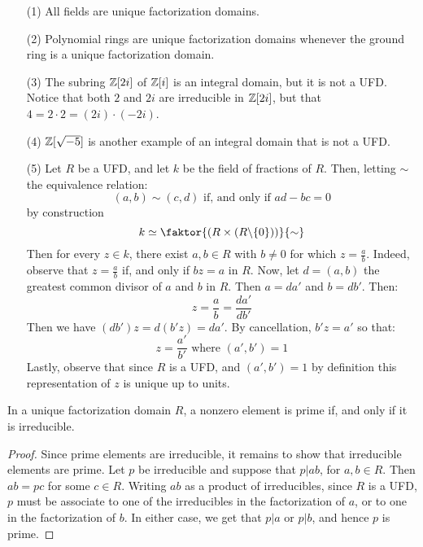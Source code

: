 \begin{example}\label{example_6.8}
  \begin{enumerate}
    \item[(1)] All fields are unique factorization domains.

    \item[(2)] Polynomial rings are unique factorization domains whenever
      the ground ring is a unique factorization domain.

    \item[(3)] The subring $\mathbb{Z}[2i]$ of $\mathbb{Z}[i]$ is an integral domain, but it
      is not a UFD. Notice that both $2$ and  $2i$ are irreducible in
      $\mathbb{Z}[2i]$, but that $4=2 \cdot 2=(2i) \cdot (-2i)$.

    \item[(4)] $\mathbb{Z}[\sqrt{-5}]$ is another example of an integral domain that
      is not a UFD.

    \item[(5)] Let $R$ be a UFD, and let $k$ be the field of fractions
      of $R$. Then, letting $\sim$ the equivalence relation:
      \begin{equation*}
        (a,b) \sim (c,d) \text{ if, and only if } ad-bc=0
      \end{equation*}
      by construction
      \begin{equation*}
        k \simeq \faktor{(R \times (\com{R}{\{0\}))}}{\sim}
      \end{equation*}
      Then for every $z \in k$, there exist $a,b \in R$ with $b \neq
      0$ for which $z=\frac{a}{b}$. Indeed, observe that
      $z=\frac{a}{b}$ if, and only if $bz=a$ in $R$. Now, let
      $d=(a,b)$ the greatest common divisor of $a$ and $b$ in $R$.
      Then $a=da'$ and $b=db'$. Then:
      \begin{equation*}
        z=\frac{a}{b}=\frac{da'}{db'}
      \end{equation*}
      Then we have $(db')z=d(b'z)=da'$. By cancellation, $b'z=a'$ so
      that:
      \begin{equation*}
        z=\frac{a'}{b'} \text{ where } (a',b')=1
      \end{equation*}
      Lastly, observe that since $R$ is a UFD, and $(a',b')=1$ by
      definition this representation of $z$ is unique up to units.
  \end{enumerate}
\end{example}

\begin{proposition}\label{proposition_6.3.3}
  In a unique factorization domain $R$, a nonzero element is prime if, and
  only if it is irreducible.
\end{proposition}
\begin{proof}
  Since prime elements are irreducible, it remains to show that irreducible
  elements are prime. Let $p$ be irreducible and suppose that  $p|ab$, for
  $a,b \in R$. Then  $ab=pc$ for some  $c \in R$. Writing  $ab$ as a product
  of irreducibles, since  $R$ is a UFD,  $p$ must be associate to one of the
  irreducibles in the factorization of $a$, or to one in the factorization of
  $b$. In either case, we get that $p|a$ or $p|b$, and hence  $p$ is prime.
\end{proof}


